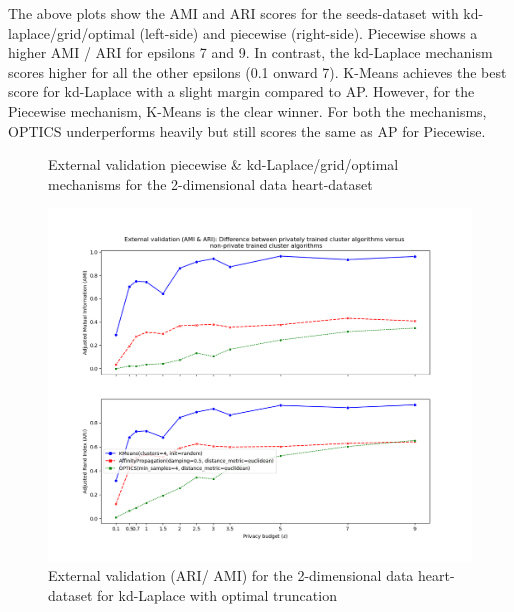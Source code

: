 \begin{figure}[H]
\end{figure}
The above plots show the AMI and ARI scores for the seeds-dataset with kd-laplace/grid/optimal (left-side) and piecewise (right-side).
Piecewise shows a higher AMI / ARI for epsilons 7 and 9. In contrast, the kd-Laplace mechanism scores higher for all the other epsilons (0.1 onward 7).
K-Means achieves the best score for kd-Laplace with a slight margin compared to AP.
However, for the Piecewise mechanism, K-Means is the clear winner.
For both the mechanisms, OPTICS underperforms heavily but still scores the same as AP for Piecewise.
\begin{figure}[H]
    \caption{External validation piecewise \& kd-Laplace/grid/optimal mechanisms for the 2-dimensional data heart-dataset}
    \centering
    \begin{minipage}[c]{0.49\textwidth}
        \includegraphics[width=1\textwidth]{Results/2d-laplace-optimal-truncated/heart-dataset/ami-and-ari.png}
        \caption{External validation (ARI/ AMI) for the 2-dimensional data heart-dataset for kd-Laplace with optimal truncation}
        \label{fig:external-validation-heart-dataset_comparison_2d-laplace}
    \end{minipage}
    \begin{minipage}[c]{0.49\textwidth}

\end{minipage}
\end{figure}
